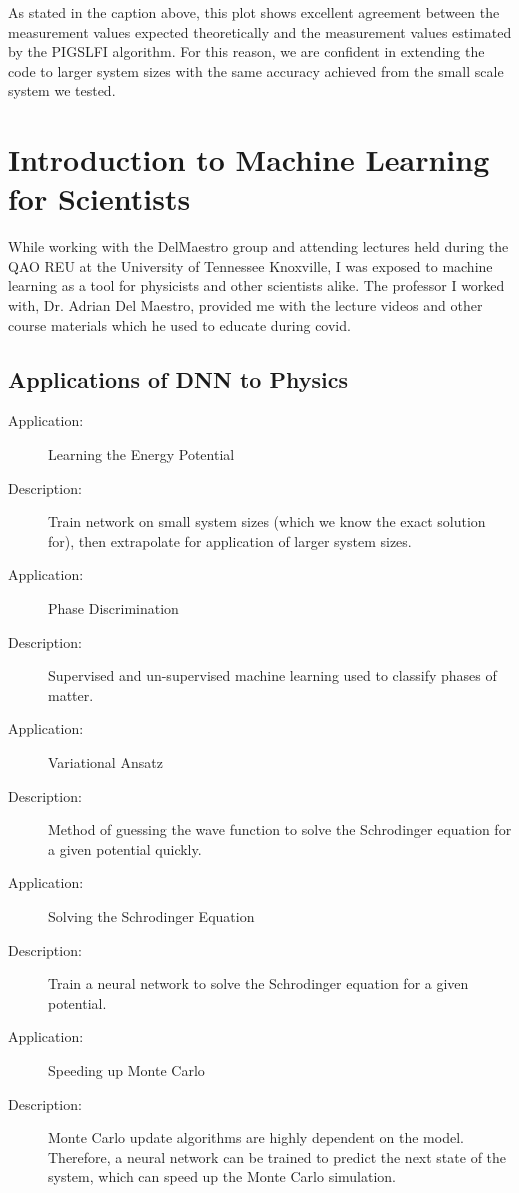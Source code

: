 As stated in the caption above, this plot shows excellent agreement between the measurement values expected theoretically and the measurement values estimated by the PIGSLFI algorithm. For this reason, we are confident in extending the code to larger system sizes with the same accuracy achieved from the small scale system we tested.

\section{Introduction to Machine Learning for Scientists}
While working with the DelMaestro group and attending lectures held during the QAO REU at the University of Tennessee Knoxville, I was exposed to machine learning as a tool for physicists and other scientists alike. The professor I worked with, Dr. Adrian Del Maestro, provided me with the lecture videos and other course materials which he used to educate during covid.

\subsection{Applications of DNN to Physics}
\begin{description}
\item [Application:] Learning the Energy Potential
\item [Description:] Train network on small system sizes (which we know the exact solution for), then extrapolate for application of larger system sizes.

\item [Application:] Phase Discrimination
\item [Description:] Supervised and un-supervised machine learning used to classify phases of matter.

\item[Application:] Variational Ansatz 
\item[Description:] Method of guessing the wave function to solve the Schrodinger equation for a given potential quickly.

\item [Application:] Solving the Schrodinger Equation
\item[Description:] Train a neural network to solve the Schrodinger equation for a given potential.

\item [Application:] Speeding up Monte Carlo
\item [Description:] Monte Carlo update algorithms are highly dependent on the model. Therefore, a neural network can be trained to predict the next state of the system, which can speed up the Monte Carlo simulation.
\end{description}

